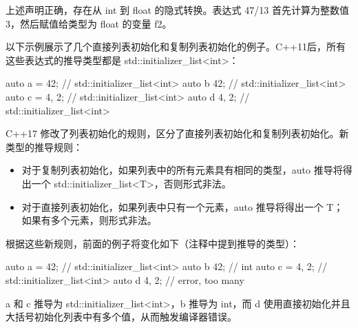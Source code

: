 上述声明正确，存在从 int 到 float 的隐式转换。表达式 47/13 首先计算为整数值 3，然后赋值给类型为 float 的变量 f2。


以下示例展示了几个直接列表初始化和复制列表初始化的例子。C++11后，所有这些表达式的推导类型都是 std::initializer\_list<int>：

\begin{cpp}
auto a = {42};   // std::initializer_list<int>
auto b {42};     // std::initializer_list<int>
auto c = {4, 2}; // std::initializer_list<int>
auto d {4, 2};   // std::initializer_list<int>
\end{cpp}

C++17 修改了列表初始化的规则，区分了直接列表初始化和复制列表初始化。新类型的推导规则：

\begin{itemize}
\item
对于复制列表初始化，如果列表中的所有元素具有相同的类型，auto 推导将得出一个 std::initializer\_list<T>，否则形式非法。

\item
对于直接列表初始化，如果列表中只有一个元素，auto 推导将得出一个 T；如果有多个元素，则形式非法。
\end{itemize}

根据这些新规则，前面的例子将变化如下（注释中提到推导的类型）：

\begin{cpp}
auto a = {42};   // std::initializer_list<int>
auto b {42};     // int
auto c = {4, 2}; // std::initializer_list<int>
auto d {4, 2};   // error, too many
\end{cpp}

a 和 c 推导为 std::initializer\_list<int>，b 推导为 int，而 d 使用直接初始化并且大括号初始化列表中有多个值，从而触发编译器错误。































